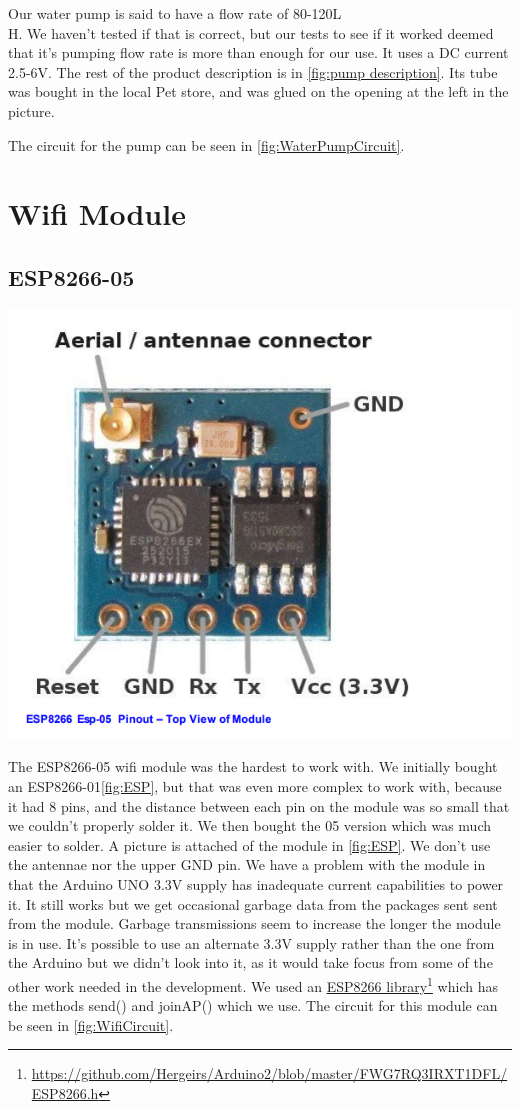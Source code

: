 \documentclass[a4paper,12pt,oneside,openright,titlepage]{book}
\newcommand\citeurl[2]{%
  \href{#1}{#2}\footnote{\url{#1}}%
}
\begin{document}
Our water pump is said to have a flow rate of 80-120L\\H. We haven't tested if that is correct, but our tests to see if it worked deemed that it's pumping flow rate is more than enough for our use. It uses a DC current 2.5-6V. The rest of the product description is in \ref{fig:pump description}. Its tube was bought in the local Pet store, and was glued on the opening at the left in the picture.

The circuit for the pump can be seen in \ref{fig:WaterPumpCircuit}. 

\section{Wifi Module}
\subsection{ESP8266-05}
\begin{center}
	\includegraphics[scale=0.3]{ESP8266}
\end{center}

The ESP8266-05 wifi module was the hardest to work with. We initially bought an ESP8266-01\ref{fig:ESP}, but that was even more complex to work with, because it had 8 pins, and the distance between each pin on the module was so small that we couldn't properly solder it. We then bought the 05 version which was much easier to solder. A picture is attached of the module in \ref{fig:ESP}. We don't use the antennae nor the upper GND pin. We have a problem with the module in that the Arduino UNO 3.3V supply has inadequate current capabilities to power it. It still works but we get occasional garbage data from the packages sent sent from the module. Garbage transmissions seem to increase the longer the module is in use. It's possible to use an alternate 3.3V supply rather than the one from the Arduino but we didn't look into it, as it would take focus from some of the other work needed in the development. We used an \citeurl{https://github.com/Hergeirs/Arduino2/blob/master/FWG7RQ3IRXT1DFL/ESP8266.h}{ESP8266 library} which  has the methods send() and joinAP() which we use. 
The circuit for this module can be seen in \ref{fig:WifiCircuit}.
\end{document}
